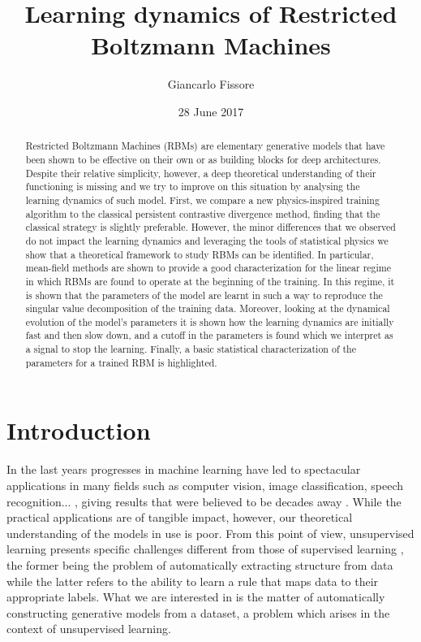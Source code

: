 \documentclass[notitlepage]{revtex4-1}
\begin{document}
\title{Learning dynamics of Restricted Boltzmann Machines}

\author{Giancarlo Fissore}

\date{28 June 2017}

\begin{abstract}
Restricted Boltzmann Machines (RBMs) are elementary generative models that have been shown to be effective on their own or as building blocks for deep architectures. Despite their relative simplicity, however, a deep theoretical understanding of their functioning is missing and we try to improve on this situation by analysing the learning dynamics of such model. First, we compare a new physics-inspired training algorithm to the classical persistent contrastive divergence method, finding that the classical strategy is slightly preferable. However, the minor differences that we observed do not impact the learning dynamics and leveraging the tools of statistical physics we show that a theoretical framework to study RBMs can be identified. In particular, mean-field methods are shown to provide a good characterization for the linear regime in which RBMs are found to operate at the beginning of the training. In this regime, it is shown that the parameters of the model are learnt in such a way to reproduce the singular value decomposition of the training data. Moreover, looking at the dynamical evolution of the model's parameters it is shown how the learning dynamics are initially fast and then slow down, and a cutoff in the parameters is found which we interpret as a signal to stop the learning. Finally, a basic statistical characterization of the parameters for a trained RBM is highlighted.
\end{abstract}

\maketitle

\section*{Introduction}
In the last years progresses in machine learning have led to spectacular applications in many fields such as computer vision, image classification, speech recognition... \cite{}\cite{}, giving results that were believed to be decades away \cite{go}. While the practical applications are of tangible impact, however, our theoretical understanding of the models in use is poor. From this point of view, unsupervised learning presents specific challenges different from those of supervised learning \cite{foundations}, the former being the problem of automatically extracting structure from data while the latter refers to the ability to learn a rule that maps data to their appropriate labels. What we are interested in is the matter of automatically constructing generative models from a dataset, a problem which arises in the context of unsupervised learning.
\end{document}
